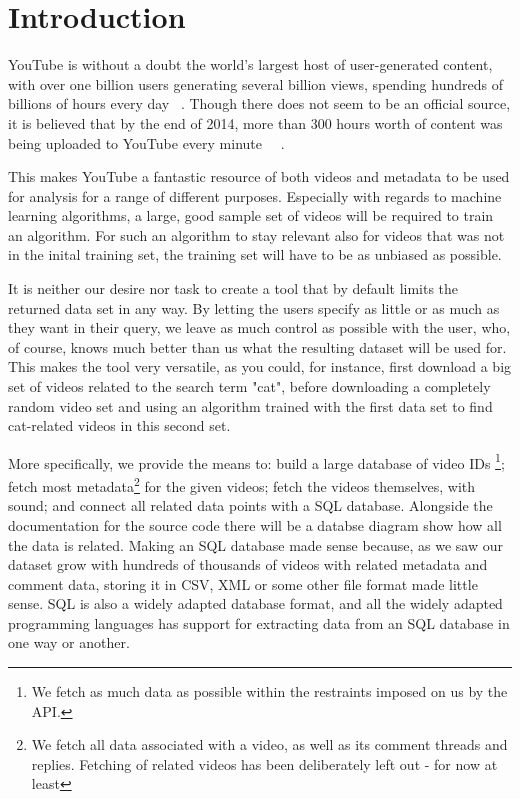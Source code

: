 
\section{Introduction}

YouTube is without a doubt the world's largest host of user-generated content,
with over one billion users generating several billion views, spending hundreds
of billions of hours every day ~\cite{officialstats}. Though there does not seem
to be an official source, it is believed that by the end of 2014, more than 300
hours worth of content was being uploaded to YouTube every minute 
~\cite{dagensmediastats}~\cite{reelseostats}. 

This makes YouTube a fantastic resource of both videos and metadata to be used
for analysis for a range of different purposes. Especially with regards to
machine learning algorithms, a large, good sample set of videos will be required
to train an algorithm. For such an algorithm to stay relevant also for videos
that was not in the inital training set, the training set will have to be as
unbiased as possible.

It is neither our desire nor task to create a tool that by default limits the
returned data set in any way. By letting the users specify as little or as much
as they want in their query, we leave as much control as possible with the user,
who, of course, knows much better than us what the resulting dataset will be
used for. This makes the tool very versatile, as you could, for instance, first
download a big set of videos related to the search term "cat", before
downloading a completely random video set and using an algorithm trained with
the first data set to find cat-related videos in this second set. 

More specifically, we provide the means to: build a large database of video IDs
\footnote{We fetch as much data as possible within the restraints imposed
on us by the API.}; fetch most metadata\footnote{We fetch all data associated
with a video, as well as its comment threads and replies. Fetching of related
videos has been deliberately left out - for now at least} for the given videos;
fetch the videos themselves, with sound; and connect all related data points
with a SQL database. Alongside the documentation for the source code there will
be a databse diagram show how all the data is related. Making an SQL database
made sense because, as we saw our dataset grow with hundreds of thousands of
videos with related metadata and comment data, storing it in CSV, XML or some
other file format made little sense. SQL is also a widely adapted database
format, and all the widely adapted programming languages has support for
extracting data from an SQL database in one way or another.

